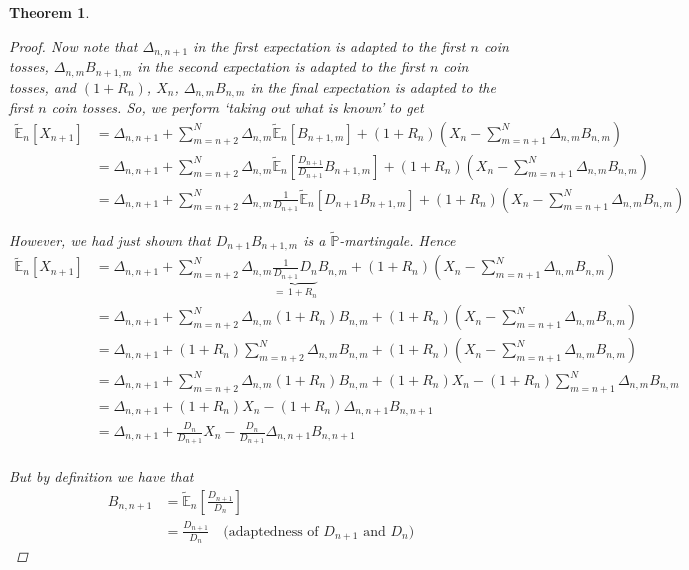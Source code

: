 \documentclass[12pt]{article}
\newtheorem{theorem}{Theorem}
\newlength\tindent
\renewcommand{\indent}{\hspace*{\tindent}}
\renewcommand{\P}{\mathbb P}
\newcommand{\E}{\mathbb E}
\begin{document}
\begin{theorem}
\begin{proof}
\indent Now note that $\Delta_{n,n + 1}$ in the first expectation is adapted to the first $n$ coin tosses, $\Delta_{n,m}B_{n + 1,m}$ in the second expectation is adapted to the first $n$ coin tosses, and $(1 + R_n)$, $X_n$, $\Delta_{n,m}B_{n,m}$ in the final expectation is adapted to the first $n$ coin tosses. So, we perform `taking out what is known' to get
\begin{align*}
	\tilde{\E}_n[X_{n + 1}] 	&= \Delta_{n, n + 1} + \sum^N_{m = n + 2} \Delta_{n,m} \tilde{\E}_n \left[ B_{n + 1,m}  \right] + (1 + R_n) \left( X_n - \sum^N_{m = n + 1} \Delta_{n,m}B_{n,m} \right) \\
	&= \Delta_{n, n + 1} + \sum^N_{m = n + 2} \Delta_{n,m} \tilde{\E}_n \left[ \frac{D_{n + 1}}{D_{n + 1}} B_{n + 1,m}  \right] + (1 + R_n) \left( X_n - \sum^N_{m = n + 1} \Delta_{n,m}B_{n,m} \right) \\
	&= \Delta_{n, n + 1} + \sum^N_{m = n + 2} \Delta_{n,m} \frac{1}{D_{n + 1}} \tilde{\E}_n \left[ D_{n + 1} B_{n + 1,m}  \right] + (1 + R_n) \left( X_n - \sum^N_{m = n + 1} \Delta_{n,m}B_{n,m} \right)
\end{align*} 

However, we had just shown that $D_{n + 1}B_{n + 1,m}$ is a $\tilde{\P}$-martingale. Hence
\begin{align*}
	\tilde{\E}_n[X_{n + 1}] &= \Delta_{n, n + 1} + \sum^N_{m = n + 2} \Delta_{n,m} \underbrace{ \frac{1}{D_{n + 1}} D_n}_{=\,1 + R_n} B_{n,m} + (1 + R_n) \left( X_n - \sum^N_{m = n + 1} \Delta_{n,m}B_{n,m} \right) \\
	&= \Delta_{n, n + 1} + \sum^N_{m = n + 2} \Delta_{n,m} (1 + R_n) B_{n,m} + (1 + R_n) \left( X_n - \sum^N_{m = n + 1} \Delta_{n,m}B_{n,m} \right) \\
	&= \Delta_{n, n + 1} + (1 + R_n)\sum^N_{m = n + 2} \Delta_{n,m} B_{n,m} + (1 + R_n) \left( X_n - \sum^N_{m = n + 1} \Delta_{n,m}B_{n,m} \right) \\
	&= \Delta_{n, n + 1} + \sum^N_{m = n + 2} \Delta_{n,m} (1 + R_n) B_{n,m} + (1 + R_n)X_n - (1 + R_n)\sum^N_{m = n + 1} \Delta_{n,m}B_{n,m} \\
	&= \Delta_{n, n + 1} + (1 + R_n)X_n - (1 + R_n)\Delta_{n,n + 1}B_{n, n + 1} \\
	&= \Delta_{n, n + 1} + \frac{D_n}{D_{n + 1}}X_n - \frac{D_n}{D_{n + 1}}\Delta_{n, n + 1}B_{n,n + 1} \\
\end{align*}

But by definition we have that
\begin{align*}
	B_{n,n + 1} &= \tilde{\E}_n \left[ \frac{D_{n + 1}}{D_n} \right] \\
	&= \frac{D_{n + 1}}{D_n} \quad \text{(adaptedness of $D_{n + 1}$ and $D_n$)}
\end{align*}


\end{proof}
\end{theorem}
\end{document}
